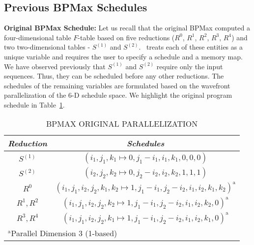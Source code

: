 \subsection{Previous BPMax Schedules}
\textbf{Original BPMax Schedule:}
Let us recall that the original BPMax computed a four-dimensional table $F$-table based on five reductions ($R^{0}$, $R^{1}$, $R^{2}$, $R^{3}$, $R^{4}$) and two two-dimensional tables - $S^{(1)}$ and $S^{(2)}$. \alphaz\ treats each of these entities as a unique variable and requires the user to specify a schedule and a memory map. We have observed previously that $S^{(1)}$ and $S^{(2)}$ require only the input sequences. Thus, they can be scheduled before any other reductions. The schedules of the remaining variables are formulated based on the wavefront parallelization of the 6-D schedule space. We highlight the original program schedule in Table~\ref{tab:bpm_original_schedule}.
\begin{table}[htbp]
\caption{\uppercase{BPMax original Parallelization}}
\begin{center}
\begin{tabular}{|c|c|}
\hline
\textbf{\textit{Reduction}}& \textbf{\textit{Schedules}} \\
\hline
$S^{(1)}$ & $(i_{1},j_{1}, k_{1} \mapsto  0, j_{1}-i_{1}, i_{1}, k_{1}, 0, 0, 0)$   \\
\cline{1-2} 
$S^{(2)}$ & $(i_{2},j_{2}, k_{2} \mapsto  0, j_{2}-i_{2}, i_{2}, k_{2}, 1, 1, 1)$   \\
\cline{1-2} 
$R^{0}$ & $(i_{1},j_{1},i_{2},j_{2},k_{1},k_{2} \mapsto 1, j_{1}-i_{1}, j_{2}-i_{2}, i_{1}, i_{2}, k_{1}, k_{2})^{\mathrm{a}}$    \\
 \cline{1-2} 
$R^{1}, R^{2}$ & $(i_{1},j_{1},i_{2},j_{2},k_{2} \mapsto 1, j_{1}-i_{1}, j_{2}-i_{2}, i_{1}, i_{2}, k_{2}, 0)^{\mathrm{a}}$   \\
\cline{1-2} 
$R^{3}, R^{4}$ & $(i_{1},j_{1},i_{2},j_{2},k_{1} \mapsto 1, j_{1}-i_{1}, j_{2}-i_{2}, i_{1}, i_{2}, k_{1}, 0)^{\mathrm{a}}$ \\
 \cline{1-2} 
\hline
\multicolumn{2}{l}{$^{\mathrm{a}}$Parallel Dimension 3 (1-based)}
\end{tabular}
\label{tab:bpm_original_schedule}
\end{center}
\end{table}